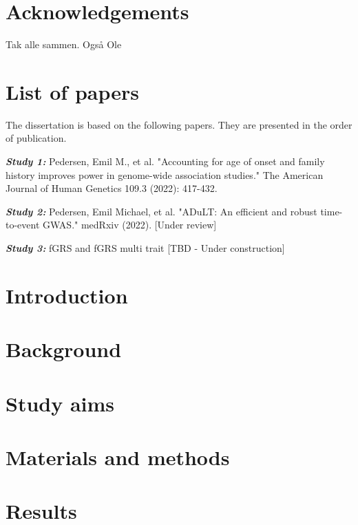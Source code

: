 \documentclass[a4paper, twoside]{report}
\begin{document}
\chapter*{Acknowledgements}
Tak alle sammen.
Også Ole

\chapter*{List of papers}
 
The dissertation is based on the following papers. They are presented in the order of publication.

\textbf{\textit{Study 1:}} Pedersen, Emil M., et al. "Accounting for age of onset and family history improves power in genome-wide association studies." The American Journal of Human Genetics 109.3 (2022): 417-432.

\textbf{\textit{Study 2:}} Pedersen, Emil Michael, et al. "ADuLT: An efficient and robust time-to-event GWAS." medRxiv (2022). [Under review]

\textbf{\textit{Study 3:}} fGRS and fGRS multi trait [TBD - Under construction]


\tableofcontents
\newpage

\chapter{Introduction}


\chapter{Background}


\chapter{Study aims}


\chapter{Materials and methods}



\chapter{Results}

\end{document}
